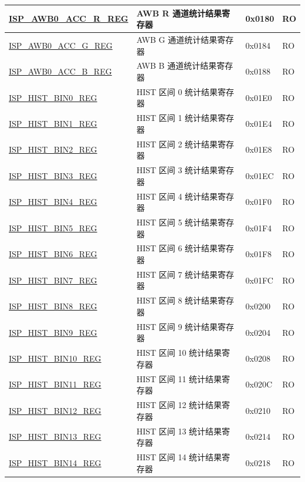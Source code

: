 \begin{longtable}{ | p{6cm} | p{7.2cm} | p{1.3cm} | p{1cm} | }
\hyperref[regdesc:ISPAWB0ACCRREG]{ISP\_AWB0\_ACC\_R\_REG} & AWB R 通道统计结果寄存器 & 0x0180 & RO \\ \hline
\hyperref[regdesc:ISPAWB0ACCGREG]{ISP\_AWB0\_ACC\_G\_REG} & AWB G 通道统计结果寄存器 & 0x0184 & RO \\ \hline
\hyperref[regdesc:ISPAWB0ACCBREG]{ISP\_AWB0\_ACC\_B\_REG} & AWB B 通道统计结果寄存器 & 0x0188 & RO \\ \hline
\hyperref[regdesc:ISPHISTBIN0REG]{ISP\_HIST\_BIN0\_REG} & HIST 区间 0 统计结果寄存器 & 0x01E0 & RO \\ \hline
\hyperref[regdesc:ISPHISTBIN1REG]{ISP\_HIST\_BIN1\_REG} & HIST 区间 1 统计结果寄存器 & 0x01E4 & RO \\ \hline
\hyperref[regdesc:ISPHISTBIN2REG]{ISP\_HIST\_BIN2\_REG} & HIST 区间 2 统计结果寄存器 & 0x01E8 & RO \\ \hline
\hyperref[regdesc:ISPHISTBIN3REG]{ISP\_HIST\_BIN3\_REG} & HIST 区间 3 统计结果寄存器 & 0x01EC & RO \\ \hline
\hyperref[regdesc:ISPHISTBIN4REG]{ISP\_HIST\_BIN4\_REG} & HIST 区间 4 统计结果寄存器 & 0x01F0 & RO \\ \hline
\hyperref[regdesc:ISPHISTBIN5REG]{ISP\_HIST\_BIN5\_REG} & HIST 区间 5 统计结果寄存器 & 0x01F4 & RO \\ \hline
\hyperref[regdesc:ISPHISTBIN6REG]{ISP\_HIST\_BIN6\_REG} & HIST 区间 6 统计结果寄存器 & 0x01F8 & RO \\ \hline
\hyperref[regdesc:ISPHISTBIN7REG]{ISP\_HIST\_BIN7\_REG} & HIST 区间 7 统计结果寄存器 & 0x01FC & RO \\ \hline
\hyperref[regdesc:ISPHISTBIN8REG]{ISP\_HIST\_BIN8\_REG} & HIST 区间 8 统计结果寄存器 & 0x0200 & RO \\ \hline
\hyperref[regdesc:ISPHISTBIN9REG]{ISP\_HIST\_BIN9\_REG} & HIST 区间 9 统计结果寄存器 & 0x0204 & RO \\ \hline
\hyperref[regdesc:ISPHISTBIN10REG]{ISP\_HIST\_BIN10\_REG} & HIST 区间 10 统计结果寄存器 & 0x0208 & RO \\ \hline
\hyperref[regdesc:ISPHISTBIN11REG]{ISP\_HIST\_BIN11\_REG} & HIST 区间 11 统计结果寄存器 & 0x020C & RO \\ \hline
\hyperref[regdesc:ISPHISTBIN12REG]{ISP\_HIST\_BIN12\_REG} & HIST 区间 12 统计结果寄存器 & 0x0210 & RO \\ \hline
\hyperref[regdesc:ISPHISTBIN13REG]{ISP\_HIST\_BIN13\_REG} & HIST 区间 13 统计结果寄存器 & 0x0214 & RO \\ \hline
\hyperref[regdesc:ISPHISTBIN14REG]{ISP\_HIST\_BIN14\_REG} & HIST 区间 14 统计结果寄存器 & 0x0218 & RO \\ \hline

\end{longtable}
